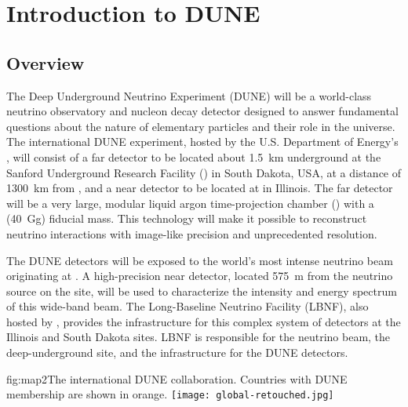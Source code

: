 \chapter{Introduction to DUNE}
\label{ch:exec-overall}

\section{Overview}
\label{sec:exec-overall-1}

The Deep Underground Neutrino Experiment (DUNE) will be a world-class neutrino observatory and nucleon decay detector designed to answer fundamental questions about the nature of elementary particles and their role in the universe. The international DUNE experiment, hosted by the U.S. Department of Energy's \fnal{}, will consist of a far detector to be located about \SI{1.5}{km} underground at the Sanford Underground Research Facility (\surf) in South Dakota, USA, at a distance of  \SI{1300}{\km} from \fnal{}, and a near detector to be located at \fnal in Illinois. The far detector will be a very large, modular liquid argon time-projection chamber (\lartpc) with a \fdfiducialmass (\SI{40}{\giga\gram}) fiducial mass. This \lar technology will make it possible to reconstruct neutrino interactions with image-like precision and unprecedented resolution. 

The DUNE detectors will be exposed to the world's most intense neutrino beam originating at \fnal{}. A high-precision near detector, located \SI{575}{m} from the neutrino source on the \fnal site, will be used to characterize the intensity and energy spectrum of this wide-band beam. The Long-Baseline Neutrino Facility (LBNF), also hosted by \fnal, provides the infrastructure for this complex system of detectors at the Illinois and South Dakota sites. LBNF is responsible for the neutrino beam, the deep-underground site, and the infrastructure for the DUNE detectors. 

\begin{dunefigure}{fig:map2}{The international DUNE
collaboration. Countries with DUNE membership are shown in orange.}
\texttt{[image: global-retouched.jpg]}  
\end{dunefigure}

